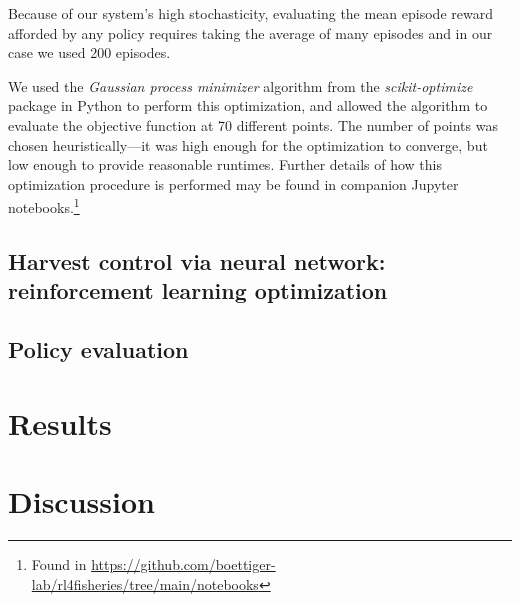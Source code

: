 \documentclass[floatfix,nofootinbib,longbibliography,notitlepage]{revtex4-1}
\begin{document}
Because of our system's high stochasticity, evaluating the mean episode reward afforded by any policy requires taking the average of many episodes and in our case we used 200 episodes. 

We used the \emph{Gaussian process minimizer} algorithm from the \emph{scikit-optimize} package in Python to perform this optimization, and allowed the algorithm to evaluate the objective function at 70 different points. 
The number of points was chosen heuristically—it was high enough for the optimization to converge, but low enough to provide reasonable runtimes. 
Further details of how this optimization procedure is performed may be found in companion Jupyter notebooks.\footnote{
Found in \url{https://github.com/boettiger-lab/rl4fisheries/tree/main/notebooks}
}

\subsection{Harvest control via neural network: reinforcement learning optimization}

\subsection{Policy evaluation}


%
%
%
\section{Results}


%
%
%
\section{Discussion}




 

\end{document}
